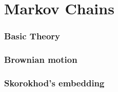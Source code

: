 

\part{Markov Chains}

%
%
\section{Basic Theory}




%
%
\section{Brownian motion}


%
%
\section{Skorokhod's embedding}
